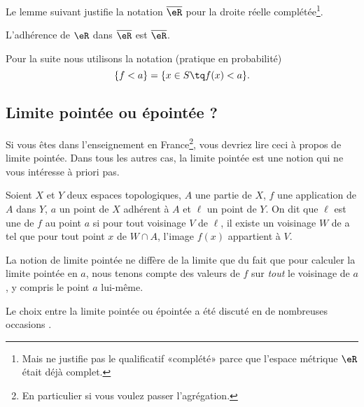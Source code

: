 Le lemme suivant justifie la notation \( \overline{ \eR }\) pour la droite réelle complétée\footnote{Mais ne justifie pas le qualificatif «complété» parce que l'espace métrique \( \eR\) était déjà complet.}.
\begin{lemma}       \label{LEMooPZXHooEEXsTC}
    L'adhérence de \( \eR\) dans \( \overline{ \eR }\) est \( \overline{ \eR }\).
\end{lemma}

Pour la suite nous utilisons la notation (pratique en probabilité)
\begin{equation}
    \{ f<a \}=\{ x\in S\tq f(x)<a \}.
\end{equation}

\subsection{Limite pointée ou épointée ?}
\label{SUBSECooVHKCooYRFgrb}

Si vous êtes dans l'enseignement en France\footnote{En particulier si vous voulez passer l'agrégation.}, vous devriez lire ceci à propos de limite pointée. Dans tous les autres cas, la limite pointée est une notion qui ne vous intéresse à priori pas.

\begin{definition}
    Soient $X$ et $Y$ deux espaces topologiques, $A$ une partie de $X$, $f$ une application de $A$ dans $Y$, $a$ un point de $X$ adhérent à $A$ et \(\ell \) un point de $Y$. On dit que \( \ell\) est une  de $f$ au point $a$ si pour tout voisinage $V$ de \( \ell\), il existe un voisinage $W$ de a tel que pour tout point $x$ de $W\cap A$, l'image $f(x)$ appartient à $V$.
\end{definition}

La notion de limite pointée ne diffère de la limite que du fait que pour calculer la limite pointée en \( a\), nous tenons compte des valeurs de \( f\) sur \emph{tout} le voisinage de \( a\), y compris le point \( a\) lui-même.

Le choix entre la limite pointée ou épointée a été discuté en de nombreuses occasions \cite{BIBooKNWHooBRoxme,BIBooNUKAooVMqppa,BIBooDILKooUcmUVD,BIBooJDPPooVONaQV}.

